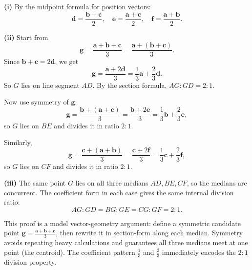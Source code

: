 \begin{solution}
\textbf{(i)} By the midpoint formula for position vectors:
\[
\mathbf{d} = \frac{\mathbf{b} + \mathbf{c}}{2}, \quad
\mathbf{e} = \frac{\mathbf{a} + \mathbf{c}}{2}, \quad
\mathbf{f} = \frac{\mathbf{a} + \mathbf{b}}{2}.
\]

\textbf{(ii)} Start from
\[
\mathbf{g} = \frac{\mathbf{a} + \mathbf{b} + \mathbf{c}}{3}
= \frac{\mathbf{a} + (\mathbf{b} + \mathbf{c})}{3}.
\]
Since $\mathbf{b} + \mathbf{c} = 2\mathbf{d}$, we get
\[
\mathbf{g} = \frac{\mathbf{a} + 2\mathbf{d}}{3}
= \frac{1}{3}\mathbf{a} + \frac{2}{3}\mathbf{d}.
\]
So $G$ lies on line segment $AD$. By the section formula, $AG:GD = 2:1$.

Now use symmetry of $\mathbf{g}$:
\[
\mathbf{g} = \frac{\mathbf{b} + (\mathbf{a} + \mathbf{c})}{3}
= \frac{\mathbf{b} + 2\mathbf{e}}{3}
= \frac{1}{3}\mathbf{b} + \frac{2}{3}\mathbf{e},
\]
so $G$ lies on $BE$ and divides it in ratio $2:1$.

Similarly,
\[
\mathbf{g} = \frac{\mathbf{c} + (\mathbf{a} + \mathbf{b})}{3}
= \frac{\mathbf{c} + 2\mathbf{f}}{3}
= \frac{1}{3}\mathbf{c} + \frac{2}{3}\mathbf{f},
\]
so $G$ lies on $CF$ and divides it in ratio $2:1$.

\textbf{(iii)} The same point $G$ lies on all three medians $AD, BE, CF$, so the medians are concurrent. The coefficient form in each case gives the same internal division ratio:
\[
AG:GD = BG:GE = CG:GF = 2:1.
\]
\end{solution}

\begin{takeaways}
This proof is a model vector-geometry argument: define a symmetric candidate point $\mathbf{g}=\tfrac{\mathbf{a}+\mathbf{b}+\mathbf{c}}{3}$, then rewrite it in section-form along each median. Symmetry avoids repeating heavy calculations and guarantees all three medians meet at one point (the centroid). The coefficient pattern $\tfrac{1}{3}$ and $\tfrac{2}{3}$ immediately encodes the $2:1$ division property.
\end{takeaways}

\vspace{1em}

